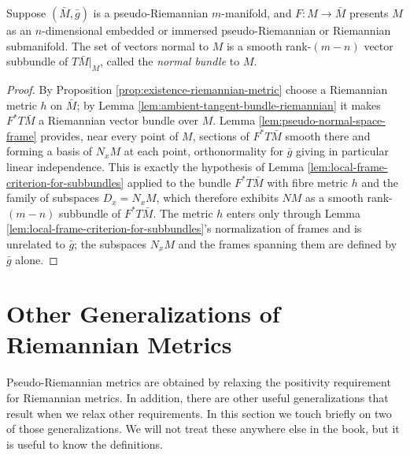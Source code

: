 \begin{corollary}
\label{cor:normal-bundle-pseudo-riemannian-submanifold}
\leanok
{}
Suppose $(\bar{M}, \bar{g})$ is a pseudo-Riemannian $m$-manifold, and $F : M \to \bar{M}$ presents $M$ as an $n$-dimensional embedded or immersed pseudo-Riemannian or Riemannian submanifold. The set of vectors normal to $M$ is a smooth rank-$(m-n)$ vector subbundle of $T\bar{M}|_M$, called the \emph{normal bundle} to $M$.
\end{corollary}

\begin{proof}
\leanok
{}
By Proposition \ref{prop:existence-riemannian-metric} choose a Riemannian metric $h$ on $\bar{M}$; by Lemma \ref{lem:ambient-tangent-bundle-riemannian} it makes $F^*T\bar{M}$ a Riemannian vector bundle over $M$. Lemma \ref{lem:pseudo-normal-space-frame} provides, near every point of $M$, sections of $F^*T\bar{M}$ smooth there and forming a basis of $N_xM$ at each point, orthonormality for $\bar{g}$ giving in particular linear independence. This is exactly the hypothesis of Lemma \ref{lem:local-frame-criterion-for-subbundles} applied to the bundle $F^*T\bar{M}$ with fibre metric $h$ and the family of subspaces $D_x = N_xM$, which therefore exhibits $NM$ as a smooth rank-$(m-n)$ subbundle of $F^*T\bar{M}$. The metric $h$ enters only through Lemma \ref{lem:local-frame-criterion-for-subbundles}'s normalization of frames and is unrelated to $\bar{g}$; the subspaces $N_xM$ and the frames spanning them are defined by $\bar{g}$ alone.
\end{proof}

\section{Other Generalizations of Riemannian Metrics}

Pseudo-Riemannian metrics are obtained by relaxing the positivity requirement for Riemannian metrics. In addition, there are other useful generalizations that result when we relax other requirements. In this section we touch briefly on two of those generalizations. We will not treat these anywhere else in the book, but it is useful to know the definitions.

